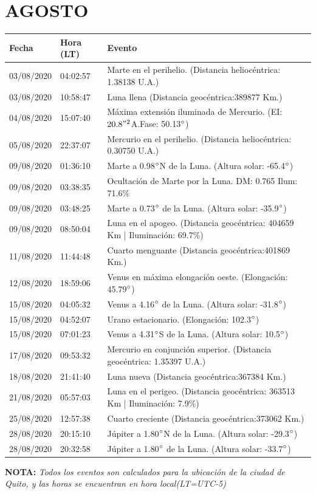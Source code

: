 \documentclass[12pt,a4paper,oneside]{article}
\begin{document}
\section{AGOSTO}
\begin{center}
\begin{tabular}{ |l| l| l| }
\hline
 \textbf{Fecha} & \textbf{Hora (LT)} & \textbf{Evento}\\
 \hline
03/08/2020 &  04:02:57   &  Marte en el perihelio. (Distancia heliocéntrica: 1.38138 U.A.)	  \\
03/08/2020 &  10:58:47   &  Luna llena (Distancia geocéntrica:389877 Km.)	  \\
04/08/2020 &  15:07:40   &  Máxima extensión iluminada de Mercurio. (EI: $20.8"^2 $A.Fase: 50.13$\degree$) 	  \\
05/08/2020 &  22:37:07   &  Mercurio en el perihelio. (Distancia heliocéntrica: 0.30750 U.A.)	  \\
09/08/2020 &  01:36:10   &  Marte a 0.98$\degree$N de la Luna. (Altura solar: -65.4$\degree$)	  \\
09/08/2020 &  03:38:35   &  Ocultación de Marte por la Luna. DM: 0.765 Ilum: 71.6\% 	  \\
09/08/2020 &  03:48:25   &  Marte a 0.73$\degree$ de la Luna. (Altura solar: -35.9$\degree$)	  \\
09/08/2020 &  08:50:04   &  Luna en el apogeo. (Distancia geocéntrica: 404659 Km | Iluminación: 69.7\%)	  \\
11/08/2020 &  11:44:48   &  Cuarto menguante (Distancia geocéntrica:401869 Km.)	  \\
12/08/2020 &  18:59:06   &  Venus en máxima elongación oeste. (Elongación: 45.79$\degree$)	  \\
15/08/2020 &  04:05:32   &  Venus a 4.16$\degree$ de la Luna. (Altura solar: -31.8$\degree$)	  \\
15/08/2020 &  04:52:07   &  Urano estacionario. (Elongación: 102.3$\degree$)	  \\
15/08/2020 &  07:01:23   &  Venus a 4.31$\degree$S de la Luna. (Altura solar: 10.5$\degree$)	  \\
17/08/2020 &  09:53:32   &  Mercurio en conjunción superior. (Distancia geocéntrica: 1.35397 U.A.)	  \\
18/08/2020 &  21:41:40   &  Luna nueva (Distancia geocéntrica:367384 Km.)	  \\ 
21/08/2020 &  05:57:03   &  Luna en el perigeo. (Distancia geocéntrica: 363513 Km | Iluminación: 7.9\%)	  \\
25/08/2020 &  12:57:38   &  Cuarto creciente (Distancia geocéntrica:373062 Km.)	  \\
28/08/2020 &  20:15:10   &  Júpiter a 1.80$\degree$N de la Luna. (Altura solar: -29.3$\degree$)	  \\
28/08/2020 &  20:32:58   &  Júpiter a 1.80$\degree$ de la Luna. (Altura solar: -33.7$\degree$)	  \\ 
\hline
\end{tabular}
\end{center}
\vspace{1cm}
\textbf{NOTA:  }\textit{Todos los eventos son calculados para la ubicaci\'on de la ciudad de Quito, y las horas se encuentran en hora local(LT=UTC-5)}
\vspace{0.7cm}
\newpage
\end{document}
